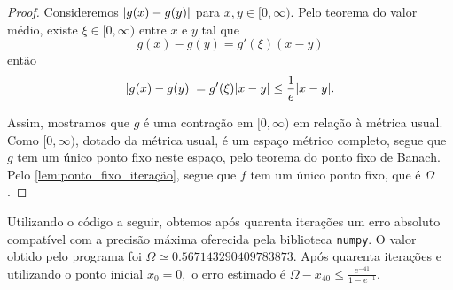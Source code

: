 \begin{proof}
    Consideremos \(\lvert g(x) - g(y)\rvert\) para \(x,y \in [0,\infty)\). Pelo teorema do valor médio, existe \(\xi \in [0, \infty)\) entre \(x\) e \(y\) tal que
    \begin{equation*}
        g(x) - g(y) = g'(\xi) (x-y)
    \end{equation*}
    então
    \begin{equation*}
        \lvert g(x) - g(y)\rvert = g'(\xi)\lvert x - y\rvert \leq \frac1e \lvert x - y\rvert.
    \end{equation*}

    Assim, mostramos que \(g\) é uma contração em \([0, \infty)\) em relação à métrica usual. Como \([0, \infty)\), dotado da métrica usual, é um espaço métrico completo, segue que \(g\) tem um único ponto fixo neste espaço, pelo teorema do ponto fixo de Banach. Pelo \cref{lem:ponto_fixo_iteração}, segue que \(f\) tem um único ponto fixo, que é \(\Omega\).
\end{proof}

Utilizando o código a seguir, obtemos após quarenta iterações um erro absoluto compatível com a precisão máxima oferecida pela biblioteca \verb|numpy|. O valor obtido pelo programa foi \(\Omega \simeq0.567143290409783873\). Após quarenta iterações e utilizando o ponto inicial \(x_0 = 0,\) o erro estimado é \(\Omega - x_{40} \leq \frac{e^{-41}}{1 - e^{-1}}.\)
\begin{listing}[htbp]
    \inputminted[linenos,fontsize=\footnotesize]{Python}{exercício10.py}
\end{listing}
